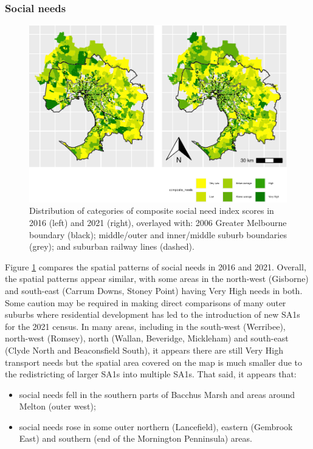 \documentclass[preprint, 3p,
authoryear]{elsarticle} %
\providecommand{\tightlist}{%
  \setlength{\itemsep}{0pt}\setlength{\parskip}{0pt}}
\begin{document}
\subsubsection{Social needs}\label{social-needs-1}

\begin{figure}
\includegraphics[width=0.9\linewidth]{Leveraging_GTFS_to_assess_transit_supply_Transport_Geography_files/figure-latex/Greater_Melbourne_2016_social_needs-1} \caption{Distribution of categories of composite social need index scores in 2016 (left) and 2021 (right), overlayed with: 2006 Greater Melbourne boundary (black); middle/outer and inner/middle suburb boundaries (grey); and suburban railway lines (dashed).}\label{fig:Greater_Melbourne_2016_social_needs}
\end{figure}

Figure \ref{fig:Greater_Melbourne_2016_social_needs} compares the
spatial patterns of social needs in 2016 and 2021. Overall, the spatial
patterns appear similar, with some areas in the north-west (Gisborne)
and south-east (Carrum Downs, Stoney Point) having Very High needs in
both. Some caution may be required in making direct comparisons of many
outer suburbs where residential development has led to the introduction
of new SA1s for the 2021 census. In many areas, including in the
south-west (Werribee), north-west (Romsey), north (Wallan, Beveridge,
Mickleham) and south-east (Clyde North and Beaconsfield South), it
appears there are still Very High transport needs but the spatial area
covered on the map is much smaller due to the redistricting of larger
SA1s into multiple SA1s. That said, it appears that:

\begin{itemize}
\tightlist
\item
  social needs fell in the southern parts of Bacchus Marsh and areas
  around Melton (outer west);
\item
  social needs rose in some outer northern (Lancefield), eastern
  (Gembrook East) and southern (end of the Mornington Penninsula) areas.
\end{itemize}
\end{document}
